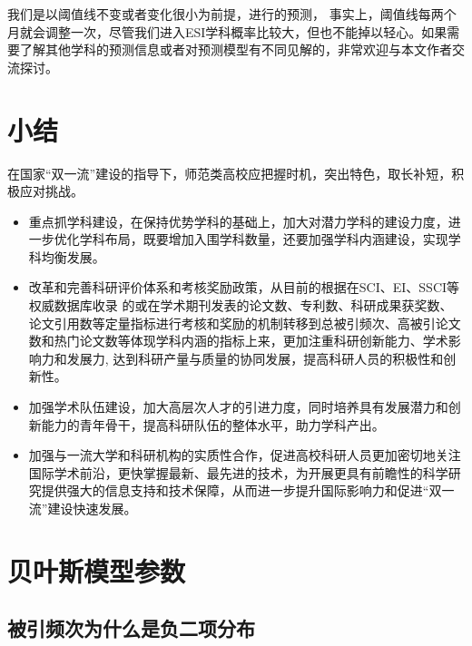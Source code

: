 \documentclass[cn, 11pt, fancy, hide]{elegantbook}
\begin{document}
我们是以阈值线不变或者变化很小为前提，进行的预测， 事实上，阈值线每两个月就会调整一次，尽管我们进入ESI学科概率比较大，但也不能掉以轻心。如果需要了解其他学科的预测信息或者对预测模型有不同见解的，非常欢迎与本文作者交流探讨。

\hypertarget{conclusion}{%
\chapter{小结}\label{conclusion}}

在国家``双一流''建设的指导下，师范类高校应把握时机，突出特色，取长补短，积极应对挑战。

\begin{itemize}
\item
  重点抓学科建设，在保持优势学科的基础上，加大对潜力学科的建设力度，进一步优化学科布局，既要增加入围学科数量，还要加强学科内涵建设，实现学科均衡发展。
\item
  改革和完善科研评价体系和考核奖励政策，从目前的根据在SCI、EI、SSCI等权威数据库收录
  的或在学术期刊发表的论文数、专利数、科研成果获奖数、论文引用数等定量指标进行考核和奖励的机制转移到总被引频次、高被引论文数和热门论文数等体现学科内涵的指标上来，更加注重科研创新能力、学术影响力和发展力, 达到科研产量与质量的协同发展，提高科研人员的积极性和创新性。
\item
  加强学术队伍建设，加大高层次人才的引进力度，同时培养具有发展潜力和创新能力的青年骨干，提高科研队伍的整体水平，助力学科产出。
\item
  加强与一流大学和科研机构的实质性合作，促进高校科研人员更加密切地关注国际学术前沿，更快掌握最新、最先进的技术，为开展更具有前瞻性的科学研究提供强大的信息支持和技术保障，从而进一步提升国际影响力和促进``双一流''建设快速发展。
\end{itemize}

\cleardoublepage

\hypertarget{appendix-ux9644ux5f55}{%
\appendix}


\hypertarget{sound}{%
\chapter{贝叶斯模型参数}\label{sound}}

\hypertarget{ux88abux5f15ux9891ux6b21ux4e3aux4ec0ux4e48ux662fux8d1fux4e8cux9879ux5206ux5e03}{%
\section{被引频次为什么是负二项分布}\label{ux88abux5f15ux9891ux6b21ux4e3aux4ec0ux4e48ux662fux8d1fux4e8cux9879ux5206ux5e03}}
\end{document}
